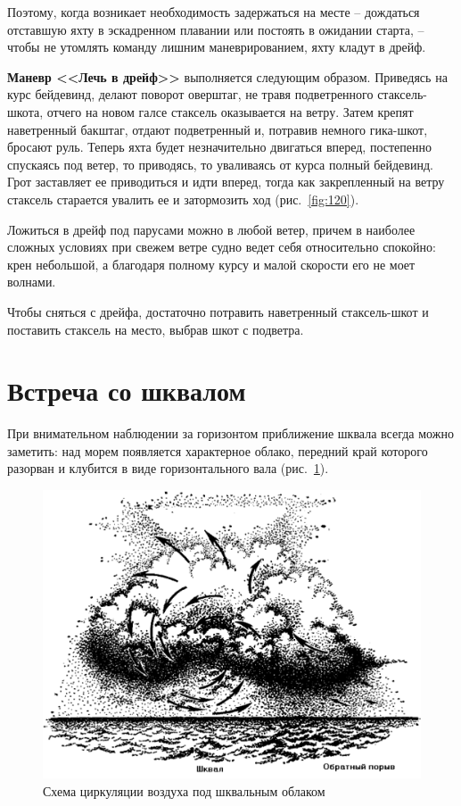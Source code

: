 \documentclass[a4paper, 12pt, twoside, final]{scrbook}
\begin{document}
Поэтому, когда возникает необходимость задержаться на месте \--- дождаться отставшую яхту в эскадренном плавании или постоять в ожидании старта, \--- чтобы не утомлять команду лишним маневрированием, яхту кладут в дрейф.

\textbf{Маневр <<Лечь в дрейф>>} выполняется следующим образом. Приведясь на курс бейдевинд, делают поворот оверштаг, не травя подветренного стаксель-шкота, отчего на новом галсе стаксель оказывается на ветру. Затем крепят наветренный бакштаг, отдают подветренный и, потравив немного гика-шкот, бросают руль. Теперь яхта будет незначительно двигаться вперед, постепенно спускаясь под ветер, то приводясь, то уваливаясь от курса полный бейдевинд. Грот заставляет ее приводиться и идти вперед, тогда как закрепленный на ветру стаксель старается увалить ее и затормозить ход (рис.~\ref{fig:120}).

Ложиться в дрейф под парусами можно в любой ветер, причем в наиболее сложных условиях при свежем ветре судно ведет себя относительно спокойно: крен небольшой, а благодаря полному курсу и малой скорости его не моет волнами.

Чтобы сняться с дрейфа, достаточно потравить наветренный стаксель-шкот и поставить стаксель на место, выбрав шкот с подветра.

\section{Встреча со шквалом}

При внимательном наблюдении за горизонтом приближение шквала всегда можно заметить: над морем появляется характерное облако, передний край которого разорван и клубится в виде горизонтального вала (рис.~\ref{fig:121}).

\begin{figure}[htbp]
   \centering
   \includegraphics{pics/121_Shema_circ_vozd} %
   \caption{Схема циркуляции воздуха под шквальным облаком}
   \label{fig:121}
\end{figure}
\end{document}

